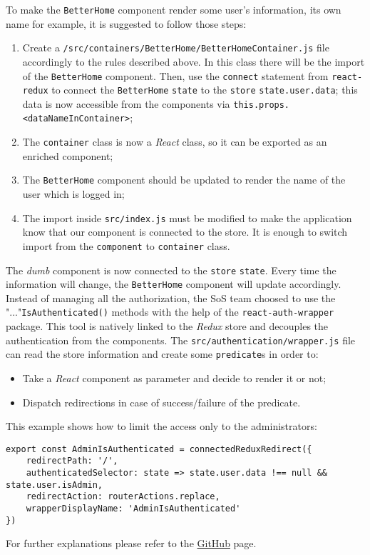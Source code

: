To make the \verb|BetterHome| component render some user's information, its own name for example, it is suggested to follow those steps:
\begin{enumerate}
	\item Create a \verb|/src/containers/BetterHome/BetterHomeContainer.js| file accordingly to the rules described above. In this class there will be the import of the \verb|BetterHome| component. Then, use the \verb|connect| statement from \verb|react-redux| to connect the \verb|BetterHome| \verb|state| to the \verb|store| \verb|state.user.data|; this data is now accessible from the components via \verb|this.props.<dataNameInContainer>|;
	\item The \verb|container| class is now a \emph{React} class, so it can be exported as an enriched component;
	\item The \verb|BetterHome| component should be updated to render the name of the user which is logged in;
	\item The import inside \verb|src/index.js| must be modified to make the application know that our component is connected to the store. It is enough to switch import from the \verb|component| to \verb|container| class.
\end{enumerate}

The \emph{dumb} component is now connected to the \verb|store| \verb|state|. Every time the information will change, the \verb|BetterHome| component will update accordingly.
\\Instead of managing all the authorization, the SoS team choosed to use the "..."\verb|IsAuthenticated()| methods with the help of the \verb|react-auth-wrapper| package. This tool is natively linked to the \emph{Redux} store and decouples the authentication from the components. The \verb|src/authentication/wrapper.js| file can read the store information and create some \verb|predicate|s in order to:
\begin{itemize}
	\item Take a \emph{React} component as parameter and decide to render it or not;
	\item Dispatch redirections in case of success/failure of the predicate.
\end{itemize}
This example shows how to limit the access only to the administrators:
\begin{lstlisting}
export const AdminIsAuthenticated = connectedReduxRedirect({
	redirectPath: '/',
	authenticatedSelector: state => state.user.data !== null && state.user.isAdmin,
	redirectAction: routerActions.replace,
	wrapperDisplayName: 'AdminIsAuthenticated'
})
\end{lstlisting}
For further explanations please refer to the \href{https://github.com/mjrussell/redux-auth-wrapper}{GitHub} page.


